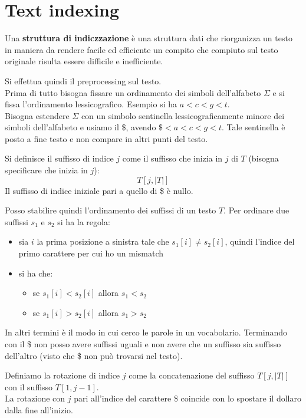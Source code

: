 \documentclass[a4paper,12pt, oneside]{book}
\begin{document}
\chapter{Text indexing}
\begin{definizione}
  Una \textbf{struttura di indiczzazione} è una
  struttura dati che riorganizza un testo in maniera da rendere facile ed
  efficiente un compito che compiuto sul testo originale risulta essere
  difficile e inefficiente. 
\end{definizione}
Si effettua quindi il preprocessing sul testo.\\
Prima di tutto bisogna fissare un ordinamento dei simboli dell'alfabeto $\Sigma$
e si fissa l'ordinamento lessicografico. Esempio si ha $a<c<g<t$.\\
Bisogna estendere $\Sigma$ con un simbolo sentinella lessicograficamente minore
dei simboli dell'alfabeto e usiamo il \$, avendo $\$<a<c<g<t$. Tale sentinella è
posto a fine testo e non compare in altri punti del testo.\\
\begin{definizione}
  Si definisce il suffisso di indice $j$ come il suffisso che inizia in $j$ di
  $T$ (bisogna specificare che inizia in $j$): 
  \[T[j,|T|]\]
  Il suffisso di indice iniziale pari a quello di \$ è nullo.
\end{definizione}
Posso stabilire quindi l'ordinamento dei suffissi di un testo $T$.
Per ordinare due suffissi $s_1$ e $s_2$ si ha la regola:
\begin{itemize}
  \item sia $i$ la prima posizione a sinistra tale che $s_1[i]\neq s_2[i]$,
  quindi l'indice del primo carattere per cui ho un mismatch
  \item si ha che:
  \begin{itemize}
    \item se $s_1[i]< s_2[i]$ allora $s_1<s_2$
     \item se $s_1[i]> s_2[i]$ allora $s_1>s_2$
  \end{itemize}
\end{itemize}
In altri termini è il modo in cui cerco le parole in un vocabolario. Terminando
con il \$ non posso avere suffissi uguali e non avere che un suffisso sia
suffisso dell'altro (visto che \$ non può trovarsi nel testo).
\begin{definizione}
  Definiamo la rotazione di indice $j$ come la concatenazione del suffisso
  $T[j,|T|]$ con il suffisso $T[1,j-1]$.\\
  La rotazione con $j$ pari all'indice del carattere \$ coincide con lo spostare
  il dollaro dalla fine all'inizio.
\end{definizione}
\end{document}
